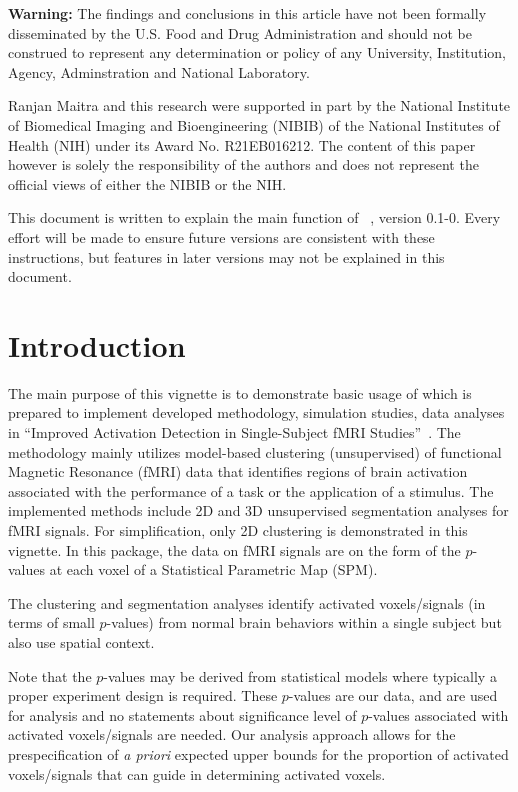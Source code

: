
{\color{red} \bf Warning:}
The findings and conclusions in this article have not been
formally disseminated by the U.S. Food and Drug Administration
and should not be construed to represent any determination or
policy of any University, Institution, Agency, Adminstration
and National Laboratory.

Ranjan Maitra and
this research were supported in part by the National Institute of
Biomedical Imaging and Bioengineering (NIBIB) of the National
Institutes of Health (NIH) under its Award No. R21EB016212.
The content of this paper however is solely the responsibility of the 
authors and does not represent the official views of either the
NIBIB or the NIH.

This document is written to explain the main
function of ~\citep{Chen2018}, version 0.1-0.
Every effort will be made to ensure future versions are consistent with
these instructions, but features in later versions may not be explained
in this document.



\section[Introduction]{Introduction}
\label{sec:introduction}

The main purpose of this vignette is to demonstrate basic usage of
 which is prepared to implement  developed methodology,
simulation studies, data analyses in
``Improved Activation Detection in Single-Subject fMRI
Studies''~\citep{ChenMaitra2018}.
The methodology mainly utilizes model-based clustering (unsupervised)
of functional Magnetic Resonance (fMRI) data that identifies regions
of brain activation associated with the performance of a task or the
application of a stimulus. The implemented methods include
2D and 3D unsupervised segmentation analyses for fMRI signals. 
For simplification, only 2D clustering is demonstrated in this vignette.
In this package, the data on fMRI signals are on the form of the
$p$-values at each voxel of a Statistical Parametric Map (SPM).

The clustering and segmentation analyses identify activated
voxels/signals (in terms of small $p$-values) from normal brain
behaviors within a single subject but also use spatial context. 

Note that the $p$-values may be derived from statistical models where
typically a proper experiment design is required.
These $p$-values are our data, and are used for 
analysis and no statements about significance level of $p$-values
associated with activated voxels/signals are needed.
Our analysis
approach allows for the prespecification of {\em a priori} expected
upper bounds for the proportion of activated voxels/signals that can
guide in determining activated voxels. 

